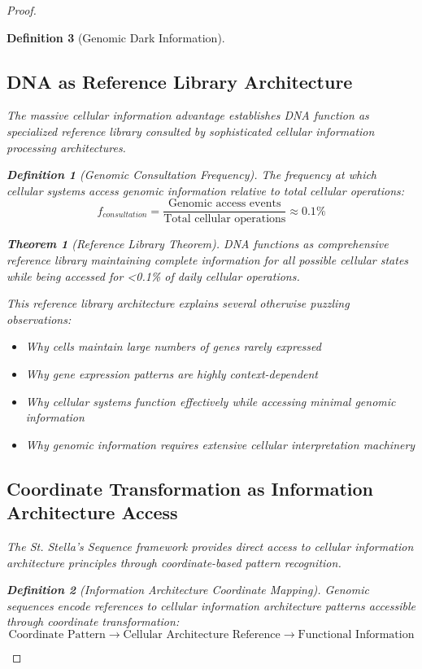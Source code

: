 \documentclass[12pt,a4paper]{article}
\newtheorem{theorem}{Theorem}
\newtheorem{definition}{Definition}
\begin{document}
\begin{proof}
\begin{definition}[Genomic Dark Information]
\subsection{DNA as Reference Library Architecture}

The massive cellular information advantage establishes DNA function as specialized reference library consulted by sophisticated cellular information processing architectures.

\begin{definition}[Genomic Consultation Frequency]
The frequency at which cellular systems access genomic information relative to total cellular operations:
\begin{equation}
f_{consultation} = \frac{\text{Genomic access events}}{\text{Total cellular operations}} \approx 0.1\%
\end{equation}
\end{definition}

\begin{theorem}[Reference Library Theorem]
DNA functions as comprehensive reference library maintaining complete information for all possible cellular states while being accessed for <0.1\% of daily cellular operations.
\end{theorem}

This reference library architecture explains several otherwise puzzling observations:
\begin{itemize}
\item Why cells maintain large numbers of genes rarely expressed
\item Why gene expression patterns are highly context-dependent
\item Why cellular systems function effectively while accessing minimal genomic information
\item Why genomic information requires extensive cellular interpretation machinery
\end{itemize}

\subsection{Coordinate Transformation as Information Architecture Access}

The St. Stella's Sequence framework provides direct access to cellular information architecture principles through coordinate-based pattern recognition.

\begin{definition}[Information Architecture Coordinate Mapping]
Genomic sequences encode references to cellular information architecture patterns accessible through coordinate transformation:
\begin{equation}
\text{Coordinate Pattern} \rightarrow \text{Cellular Architecture Reference} \rightarrow \text{Functional Information}
\end{equation}
\end{definition}


\end{definition}
\end{proof}
\end{document}
